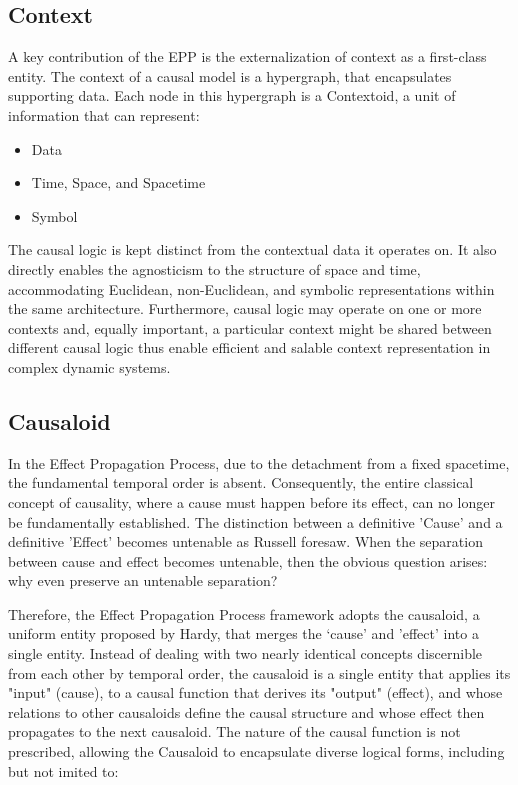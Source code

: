 %
%
\subsection{Context}
\label{sec:epp_context}

A key contribution of the EPP is the externalization of context as a first-class entity.
The context of a causal model is a hypergraph, that encapsulates supporting data. 
Each node in this hypergraph is a Contextoid, a unit of information that can represent:

\begin{itemize}
	\item Data
	\item Time, Space, and Spacetime
	\item Symbol 
\end{itemize}

The causal logic is kept distinct from the contextual data it operates on. It also directly enables the  agnosticism to the structure of space and time, accommodating Euclidean, non-Euclidean, and symbolic representations within the same architecture. Furthermore,  causal logic  may operate on one or more contexts and, equally important, a particular context might be shared between different causal logic thus enable efficient and salable context representation in complex dynamic systems. 
%
%
\subsection{Causaloid}
\label{sec:epp_causaloid}

In the Effect Propagation Process, due to the detachment from a fixed spacetime, the fundamental temporal order is absent. Consequently, the entire classical concept of causality, where a cause must happen before its effect, can no longer be fundamentally established. The distinction between a definitive 'Cause' and a definitive 'Effect' becomes untenable as Russell foresaw. When the separation between cause and effect becomes untenable, then the obvious question arises: why even preserve an untenable separation?

Therefore, the Effect Propagation Process framework adopts the causaloid, a uniform entity proposed by Hardy\cite{HardyDynamicCausalStructure}, that merges the ‘cause' and 'effect' into a single entity. Instead of dealing with two nearly identical concepts discernible from each other by temporal order, the causaloid is a single entity that applies its "input" (cause), to a causal function that derives its "output" (effect), and whose relations to other causaloids define the causal structure and whose effect then propagates to the next causaloid. The nature of the causal function is not prescribed, allowing the Causaloid to encapsulate diverse logical forms, including but not imited to:

